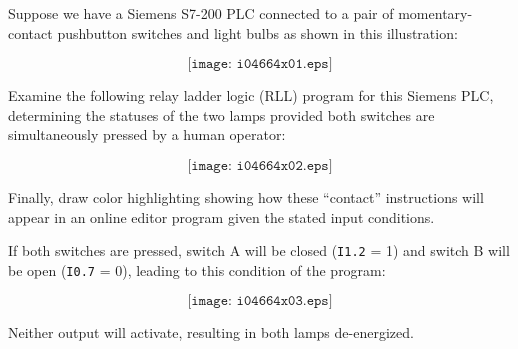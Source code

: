 

Suppose we have a Siemens S7-200 PLC connected to a pair of momentary-contact pushbutton switches and light bulbs as shown in this illustration:

$$\texttt{[image: i04664x01.eps]}$$

Examine the following relay ladder logic (RLL) program for this Siemens PLC, determining the statuses of the two lamps provided both switches are simultaneously pressed by a human operator:

$$\texttt{[image: i04664x02.eps]}$$

Finally, draw color highlighting showing how these ``contact'' instructions will appear in an online editor program given the stated input conditions.







If both switches are pressed, switch A will be closed ({\tt I1.2} = 1) and switch B will be open ({\tt I0.7} = 0), leading to this condition of the program:

$$\texttt{[image: i04664x03.eps]}$$

Neither output will activate, resulting in both lamps de-energized.











